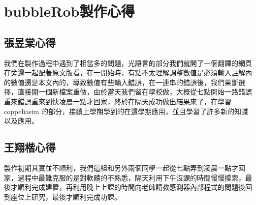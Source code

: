\chapter{bubbleRob製作心得}
\section{張昱棠心得}
我們在製作過程中遇到了相當多的問題，光語言的部分我們就開了一個翻譯的網頁在旁邊一起配著原文版看，在一開始時，有點不太理解調整數值是必須輸入註解內的數值還是本文內的，導致數值有些輸入錯誤，在一連串的錯誤後，我們果斷選擇，直接開一個新檔案重做，由於當天我們留在學校做，大概從七點開始一路錯誤重來錯誤重來到快凌晨一點才回家，終於在隔天成功做出結果來了，在學習coppeliasim 的部分，接續上學期學到的在這學期應用，並且學習了許多新的知識以及應用。
 \section{王翔楷心得}
 製作初期其實並不順利，我們這組和另外兩個同學一起從七點弄到凌晨一點才回家，過程中最難克服的是對軟體的不熟悉，隔天利用下午沒課的時間慢慢摸索，最後才順利完成建置，再利用晚上上課的時間向老師請教感測器內部程式的問題後回到座位上研究，最後才順利完成功課。
\newpage